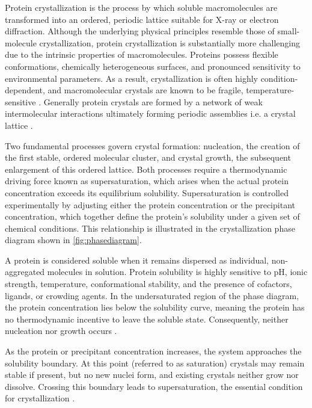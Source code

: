 Protein crystallization is the process by which soluble macromolecules are transformed into an ordered, periodic lattice suitable for X-ray or electron diffraction. Although the underlying physical principles resemble those of small-molecule crystallization, protein crystallization is substantially more challenging due to the intrinsic properties of macromolecules. Proteins possess flexible conformations, chemically heterogeneous surfaces, and pronounced sensitivity to environmental parameters. As a result, crystallization is often highly condition-dependent, and macromolecular crystals are known to be fragile, temperature-sensitive \parencite{McPherson2013}. Generally protein crystals are formed by a network of weak intermolecular interactions ultimately forming periodic assemblies i.e. a crystal lattice \parencite{Rupp2009}.

Two fundamental processes govern crystal formation: nucleation, the creation of the first stable, ordered molecular cluster, and crystal growth, the subsequent enlargement of this ordered lattice. Both processes require a thermodynamic driving force known as supersaturation, which arises when the actual protein concentration exceeds its equilibrium solubility. Supersaturation is controlled experimentally by adjusting either the protein concentration or the precipitant concentration, which together define the protein’s solubility under a given set of chemical conditions. This relationship is illustrated in the crystallization phase diagram shown in 
\autoref{fig:phasediagram}.

A protein is considered soluble when it remains dispersed as individual, non-aggregated molecules in solution. Protein solubility is highly sensitive to pH, ionic strength, temperature, conformational stability, and the presence of cofactors, ligands, or crowding agents. In the undersaturated region of the phase diagram, the protein concentration lies below the solubility curve, meaning the protein has no thermodynamic incentive to leave the soluble state. Consequently, neither nucleation nor growth occurs \parencite{Bergfors2009, Rupp2009}.

As the protein or precipitant concentration increases, the system approaches the solubility boundary. At this point (referred to as saturation) crystals may remain stable if present, but no new nuclei form, and existing crystals neither grow nor dissolve. Crossing this boundary leads to supersaturation, the essential condition for crystallization \parencite{Bijelic2018}.

